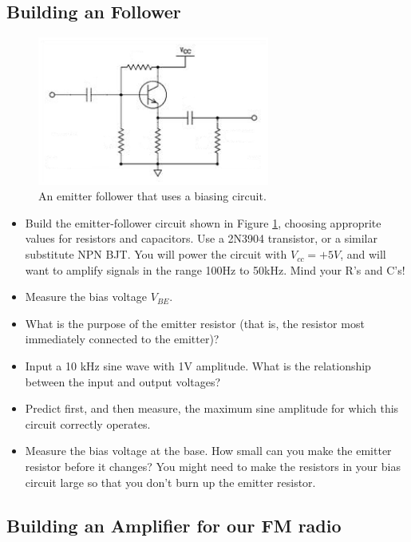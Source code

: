 \documentclass[11pt]{article}
\begin{document}
\subsection{Building an Follower}

\begin{figure}[h!]\centering
\includegraphics[width=3in]{plots/biased_emitter_follower.png}
\caption{An emitter follower that uses a biasing circuit.}
\label{fig:emitter_follower}
\end{figure}

\begin{itemize}[noitemsep,nolistsep]
\item Build the emitter-follower circuit shown in Figure \ref{fig:emitter_follower}, choosing approprite
values for resistors and capacitors.  Use a 2N3904 transistor, or a similar substitute NPN BJT.  You will
power the circuit with $V_{cc}=+5V$, and will want to amplify signals in the range 100Hz to 50kHz.  Mind
your R's and C's!
\item Measure the bias voltage $V_{BE}$.
\item What is the purpose of the emitter resistor (that is, the resistor most immediately connected to the
emitter)?
\item Input a 10 kHz sine wave with 1V amplitude.  What is the relationship between the input and output voltages?
\item Predict first, and then measure, the maximum sine amplitude for which this circuit correctly operates.
\item Measure the bias voltage at the base.  How small can you make the emitter resistor before it changes?  You
might need to make the resistors in your bias circuit large so that you don't burn up the emitter resistor.
\end{itemize}

\subsection{Building an Amplifier for our FM radio}
\end{document}
